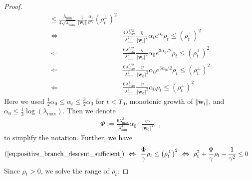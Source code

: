 \documentclass[pdflatex,sn-basic]{sn-jnl}%
\theoremstyle{thmstyleone}%
\begin{document}
\begin{appendices}
\begin{proof}
\begin{equation}
\begin{aligned}
    \le 
    \frac{\lambda_{\min}}{4 \sqrt{\lambda_{\max}}}
    \frac{1}{\Vert \mathbf{w}_{t} \Vert}
    \frac{\alpha_{t}}{e^{\alpha_{t}}}
    \left(
      \rho_{t}^{\perp}
    \right)^2 
    \\ \ \boldsymbol{\Leftrightarrow} \ \ & 
    \frac{4\lambda_{\max}^{3/2} }{\lambda_{\min}^2 }
    \frac{\eta}{\Vert \mathbf{w}_{t} \Vert^2}
    \alpha_te^{\alpha_{t}}
    {\rho}_{t}
    \le 
    \left(
      \rho_{t}^{\perp}
    \right)^2 
    \\ \ \boldsymbol{\Leftarrow} \ \ & 
    \frac{6\lambda_{\max}^{3/2} }{\lambda_{\min}^2 }
    \frac{\eta}{\Vert \mathbf{w}_{t} \Vert^2}
    \alpha_0 e^{3\alpha_{0}/2}
    {\rho}_{t}
    \le 
    \left(
      \rho_{t}^{\perp}
    \right)^2 
    \\ \ \boldsymbol{\Leftarrow} \ \ & 
    \frac{6\lambda_{\max}^{3/2} }{\lambda_{\min}^2 }
    \frac{\eta}{\Vert \mathbf{w}_{0} \Vert^2}
    \alpha_0 e^{3\alpha_{0}/2}
    {\rho}_{t}
    \le 
    \left(
      \rho_{t}^{\perp}
    \right)^2 
    \\ \ \boldsymbol{\Leftarrow} \ \ & 
    \frac{6\lambda_{\max}^{2} }{\lambda_{\min}^2 }
    \frac{\eta}{\Vert \mathbf{w}_{0} \Vert^2}
    \alpha_0
    {\rho}_{t}
    \le 
    \left( \rho_{t}^{\perp} \right)^2 
  \end{aligned}
  \end{equation}
  Here we used $\frac{1}{2}\alpha_0 \le \alpha_t \le \frac{3}{2}\alpha_0$ for $t < T_0$, monotonic growth of $\Vert \mathbf{w}_t \Vert$, and $\alpha_0 \le \frac{1}{3}\log(\lambda_{\max})$.
  Then we denote 
  \begin{equation*}
  \begin{aligned}
    \Phi := \frac{6\lambda_{\max}^2 }{\lambda_{\min}^2 }
    \alpha_0 \cdot \frac{\eta \gamma}{\Vert \mathbf{w}_{0} \Vert^2}.
  \end{aligned},
  \end{equation*}
  to simplify the notation. Further, we have 
  \begin{equation*}
  \begin{aligned}
    (\ref{eq:positive_branch_descent_sufficient})
    \ \boldsymbol{\Leftrightarrow} \ \ & 
    \frac{\Phi}{\gamma}
    {\rho}_{t}
    \le 
    \left(
      \rho_{t}^{\perp}
    \right)^2 
    \ \boldsymbol{\Leftrightarrow} \ 
    {\rho}_{t}^2 + \frac{\Phi}{\gamma} {\rho}_{t} - \frac{1}{\gamma^2} \le  0
  \end{aligned}
  \end{equation*}
  Since $\rho_t > 0$, we solve the range of $\rho_t$:

\end{proof}
\end{appendices}
\end{document}
